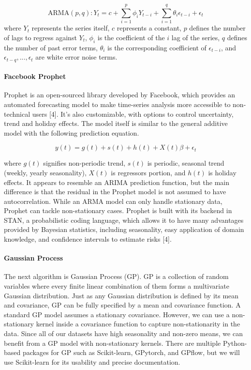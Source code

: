 \documentclass{article}
\begin{document}
$$\text{ARMA}(p, q): Y_t = c + \sum_{i=1}^{p} \phi_i Y_{t-i} + \sum_{i=1}^q \theta_i \epsilon_{t-i} + \epsilon_t$$ where $Y_t$ represents the series itself, $c$ represents a constant, $p$ defines the number of lags to regress against $Y_t$, $\phi_i$ is the coefficient of the $i$ lag of the series, $q$ defines the number of past error terms, $\theta_i$ is the corresponding coefficient of $\epsilon_{t-i}$, and $\epsilon_{t-q},...,\epsilon_{t}$ are white error noise terms.

\paragraph{Facebook Prophet}

Prophet is an open-sourced library developed by Facebook, which provides an automated forecasting model to make time-series analysis more accessible to non-technical users [4]. It’s also customizable, with options to control uncertainty, trend and holiday effects. The model itself is similar to the general additive model with the following prediction equation. 

$$y(t) = g(t) + s(t) + h(t) + X(t)\beta + \epsilon_t$$

where $g(t)$ signifies non-periodic trend, $s(t)$ is periodic, seasonal trend (weekly, yearly seasonality), $X(t)$ is regressors portion, and $h(t)$ is holiday effects. It appears to resemble an ARIMA prediction function, but the main difference is that the residual in the Prophet model is not assumed to have autocorrelation. While an ARMA model can only handle stationary data, Prophet can tackle non-stationary cases. Prophet is built with its backend in STAN, a probabilistic coding language, which allows it to have many advantages provided by Bayesian statistics, including seasonality, easy application of domain knowledge, and confidence intervals to estimate risks [4].

\paragraph{Gaussian Process}
The next algorithm is Gaussian Process (GP). GP is a collection of random variables where every finite linear combination of them forms a multivariate Gaussian distribution. Just as any Gaussian distribution is defined by its mean and covariance, GP can be fully specified by a mean and covariance function. A standard GP model assumes a stationary covariance. However, we can use a non-stationary kernel inside a covariance function to capture non-stationarity in the data. Since all of our datasets have high seasonality and non-zero means, we can benefit from a GP model with non-stationary kernels. There are multiple Python-based packages for GP such as Scikit-learn, GPytorch, and GPflow, but we will use Scikit-learn for its usability and precise documentation.
\end{document}
